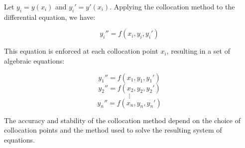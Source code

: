 Let \(y_i = y(x_i)\) and \(y_i' = y'(x_i)\). Applying the collocation method to the differential equation, we have:

\[
y_i'' = f(x_i, y_i, y_i')
\]

This equation is enforced at each collocation point \(x_i\), resulting in a set of algebraic equations:

\[
y_1'' = f(x_1, y_1, y_1')
\]
\[
y_2'' = f(x_2, y_2, y_2')
\]
\[
\vdots
\]
\[
y_n'' = f(x_n, y_n, y_n')
\]

 The accuracy and stability of the collocation method depend on the choice of collocation points and the method used to solve the resulting system of equations.



